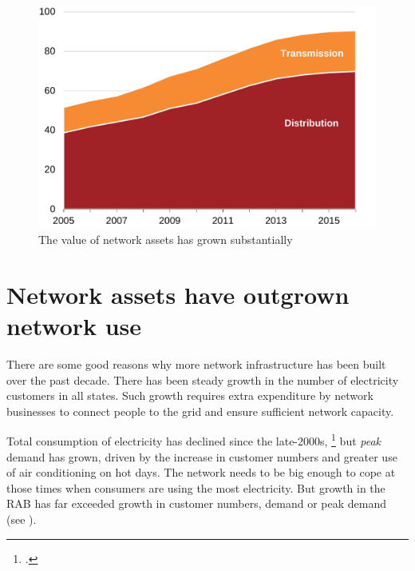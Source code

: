 \documentclass[FrontPage]{grattan}
\begin{document}
\begin{figure}
\caption{The value of network assets has grown substantially}\label{fig:network-growth-over-time}
\includegraphics[page=1]{atlas/Charts.pdf}
\end{figure}

\section{Network assets have outgrown network use}\label{sec:network-growth-outgrown-usage}
There are some good reasons why more network infrastructure has been built over the past decade. There has been steady growth in the number of electricity customers in all states. Such growth requires extra expenditure by network businesses to connect people to the grid and ensure sufficient network capacity.

Total consumption of electricity has declined since the late-2000s,%
\footcite{AER2018NEMelectricityconsumption}
but \textit{peak} demand has grown, driven by the increase in customer numbers and greater use of air conditioning on hot days. The network needs to be big enough to cope at those times when consumers are using the most electricity. But growth in the RAB has far exceeded growth in customer numbers, demand or peak demand (see ). 
\end{document}
